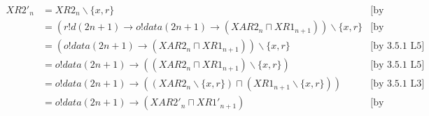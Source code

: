 \documentclass[a4paper, 10pt]{article}
\newcommand{\how}[1]{\text{[#1]}}
\newcommand{\bxr}{\backslash \{x, r\}}
\begin{document}
\begin{align*}
  XR2'_n &= XR2_n \bxr &\how{by definition}\\
  &= (r!d(2n+1) \to o!data(2n+1) \to (XAR2_n \sqcap XR1_{n+1})) \bxr
  &\how{by expansion}\\
  &= (o!data(2n+1) \to (XAR2_n \sqcap XR1_{n+1})) \bxr &\how{by 3.5.1
    L5}\\
  &= o!data(2n+1) \to ((XAR2_n \sqcap XR1_{n+1}) \bxr) &\how{by 3.5.1
    L5}\\
  &= o!data(2n+1) \to ((XAR2_n \bxr) \sqcap (XR1_{n+1} \bxr)) &\how{by
    3.5.1 L3}\\
  &= o!data(2n+1) \to (XAR2'_n \sqcap XR1'_{n+1}) &\how{by
    substitution}\\
\end{align*}
\end{document}
